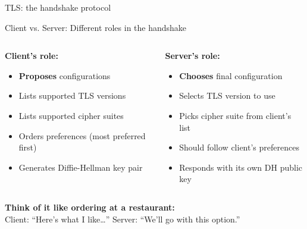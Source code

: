 \documentclass[aspectratio=169, lualatex, handout]{beamer}
\begin{document}
\begin{frame}{TLS: the handshake protocol}
\end{frame}

\begin{frame}{Client vs. Server: Different roles in the handshake}
	\begin{columns}[c]
		\begin{column}{0.5\textwidth}
			\textbf{Client's role:}
			\begin{itemize}
				\item \textbf{Proposes} configurations
				\item Lists supported TLS versions
				\item Lists supported cipher suites
				\item Orders preferences (most preferred first)
				\item Generates Diffie-Hellman key pair
			\end{itemize}
		\end{column}
		\begin{column}{0.5\textwidth}
			\textbf{Server's role:}
			\begin{itemize}
				\item \textbf{Chooses} final configuration
				\item Selects TLS version to use
				\item Picks cipher suite from client's list
				\item Should follow client's preferences
				\item Responds with its own DH public key
			\end{itemize}
		\end{column}
	\end{columns}
	\pause
	\begin{center}
		\textbf{Think of it like ordering at a restaurant:}\\
		Client: ``Here's what I like\ldots'' \quad Server: ``We'll go with this option.''
	\end{center}
\end{frame}
\end{document}
